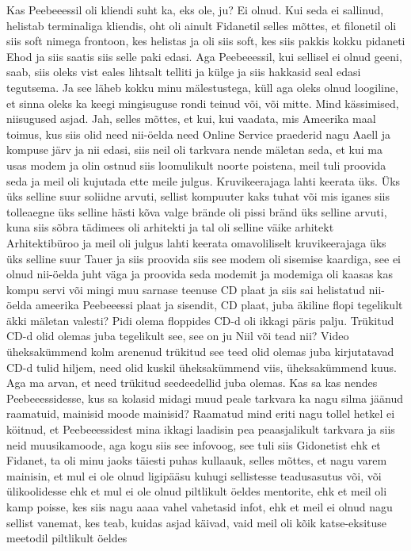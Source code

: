 Kas Peebeeessil oli kliendi suht ka, eks ole, ju? Ei olnud.
Kui seda ei sallinud, helistab terminaliga kliendis, oht oli ainult Fidanetil selles mõttes, et filonetil oli siis soft nimega frontoon, kes helistas ja oli siis soft, kes siis pakkis kokku pidaneti Ehod ja siis saatis siis selle paki edasi. Aga Peebeeessil, kui sellisel ei olnud geeni, saab, siis oleks vist eales lihtsalt telliti ja külge ja siis hakkasid seal edasi tegutsema.
Ja see läheb kokku minu mälestustega, küll aga oleks olnud loogiline, et sinna oleks ka keegi mingisuguse rondi teinud või, või mitte. Mind kässimised, niisugused asjad.
Jah, selles mõttes, et kui, kui vaadata, mis Ameerika maal toimus, kus siis olid need nii-öelda need Online Service praederid nagu Aaell ja kompuse järv ja nii edasi, siis neil oli tarkvara nende mäletan seda, et kui ma usas modem ja olin ostnud siis loomulikult noorte poistena, meil tuli proovida seda ja meil oli kujutada ette meile julgus.
Kruvikeerajaga lahti keerata üks.
Üks üks selline suur soliidne arvuti, sellist kompuuter kaks tuhat või mis iganes siis tolleaegne üks selline hästi kõva valge brände oli pissi bränd üks selline arvuti, kuna siis sõbra tädimees oli arhitekti ja tal oli selline väike arhitekt Arhitektibüroo ja meil oli julgus lahti keerata omavoliliselt kruvikeerajaga üks üks selline suur Tauer ja siis proovida siis see modem oli sisemise kaardiga, see ei olnud nii-öelda juht väga ja proovida seda modemit ja modemiga oli kaasas kas kompu servi või mingi muu sarnase teenuse CD plaat ja siis sai helistatud nii-öelda ameerika Peebeeessi plaat ja sisendit, CD plaat, juba äkiline flopi tegelikult äkki mäletan valesti?
Pidi olema floppides CD-d oli ikkagi päris palju.
Trükitud CD-d olid olemas juba tegelikult see, see on ju Niil või tead nii? Video üheksakümmend kolm arenenud trükitud see teed olid olemas juba kirjutatavad CD-d tulid hiljem, need olid kuskil üheksakümmend viis, üheksakümmend kuus. Aga ma arvan, et need trükitud seedeedellid juba olemas.
Kas sa kas nendes Peebeeessidesse, kus sa kolasid midagi muud peale tarkvara ka nagu silma jäänud raamatuid, mainisid moode mainisid?
Raamatud mind eriti nagu tollel hetkel ei köitnud, et Peebeeessidest mina ikkagi laadisin pea peaasjalikult tarkvara ja siis neid muusikamoode, aga kogu siis see infovoog, see tuli siis Gidonetist ehk et Fidanet, ta oli minu jaoks täiesti puhas kullaauk, selles mõttes, et nagu varem mainisin, et mul ei ole olnud ligipääsu kuhugi sellistesse teadusasutus või, või ülikoolidesse ehk et mul ei ole olnud piltlikult öeldes mentorite, ehk et meil oli kamp poisse, kes siis nagu aaaa vahel vahetasid infot, ehk et meil ei olnud nagu sellist vanemat, kes teab, kuidas asjad käivad, vaid meil oli kõik katse-eksituse meetodil piltlikult öeldes
